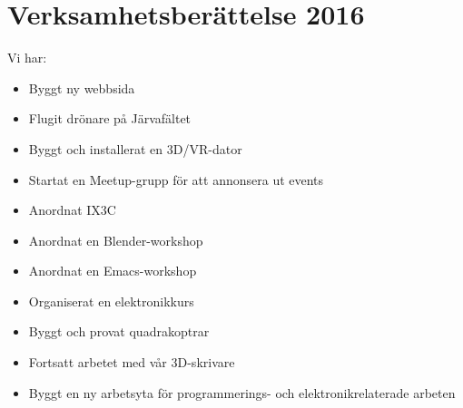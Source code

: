 \documentclass[a4paper,11pt,oneside]{article}
\begin{document}
\section{Verksamhetsberättelse 2016}

Vi har: \\
\begin{itemize}
\item Byggt ny webbsida
\item Flugit drönare på Järvafältet
\item Byggt och installerat en 3D/VR-dator
\item Startat en Meetup-grupp för att annonsera ut events
\item Anordnat IX3C
\item Anordnat en Blender-workshop
\item Anordnat en Emacs-workshop
\item Organiserat en elektronikkurs
\item Byggt och provat quadrakoptrar
\item Fortsatt arbetet med vår 3D-skrivare
\item Byggt en ny arbetsyta för programmerings- och elektronikrelaterade arbeten
\end{itemize}
\end{document}

